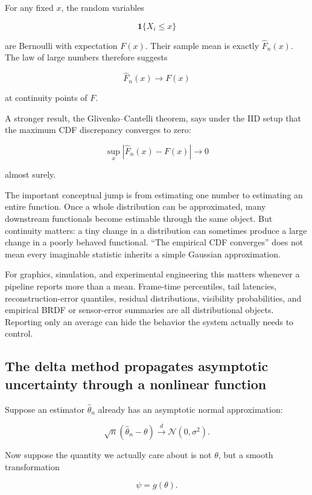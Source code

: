For any fixed \(x\), the random variables

\[
\mathbf 1\{X_i\le x\}
\]

are Bernoulli with expectation \(F(x)\). Their sample mean is exactly \(\widehat F_n(x)\). The law of large numbers therefore suggests

\[
\widehat F_n(x)\to F(x)
\]

at continuity points of \(F\).

A stronger result, the Glivenko--Cantelli theorem, says under the IID setup that the maximum CDF discrepancy converges to zero:

\[
\boxed{
\sup_x
\left|
\widehat F_n(x)-F(x)
\right|
\longrightarrow 0
}
\]

almost surely.

The important conceptual jump is from estimating one number to estimating an entire function. Once a whole distribution can be approximated, many downstream functionals become estimable through the same object. But continuity matters: a tiny change in a distribution can sometimes produce a large change in a poorly behaved functional. ``The empirical CDF converges'' does not mean every imaginable statistic inherits a simple Gaussian approximation.

For graphics, simulation, and experimental engineering this matters whenever a pipeline reports more than a mean. Frame-time percentiles, tail latencies, reconstruction-error quantiles, residual distributions, visibility probabilities, and empirical BRDF or sensor-error summaries are all distributional objects. Reporting only an average can hide the behavior the system actually needs to control.

\subsection{The delta method propagates asymptotic uncertainty through a nonlinear function}\label{02-foundations-ii-ch030-the-delta-method-propagates-asymptotic-uncertainty-through-a-nonlinear-function}

Suppose an estimator \(\widehat\theta_n\) already has an asymptotic normal approximation:

\[
\sqrt n(\widehat\theta_n-\theta)
\xrightarrow{d}
\mathcal N(0,\sigma^2).
\]

Now suppose the quantity we actually care about is not \(\theta\), but a smooth transformation

\[
\psi=g(\theta).
\]

